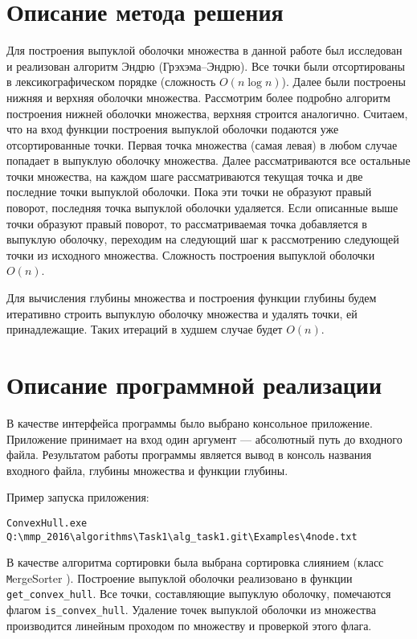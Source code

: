 \documentclass[twoside]{article}
\newcommand{\inlinecode}{\texttt}
\begin{document}
\section{Описание метода решения}
Для построения выпуклой оболочки множества в данной работе был исследован и реализован алгоритм Эндрю (Грэхэма--Эндрю). Все точки были отсортированы в лексикографическом порядке (сложность $O(n \log n)$). Далее были построены нижняя и верхняя оболочки множества. Рассмотрим более подробно алгоритм построения нижней оболочки множества, верхняя строится аналогично. Считаем, что на вход функции построения выпуклой оболочки подаются уже отсортированные точки. Первая точка множества (самая левая) в любом случае попадает в выпуклую оболочку множества. Далее рассматриваются все остальные точки множества, на каждом шаге рассматриваются текущая точка и две последние точки выпуклой оболочки. Пока эти точки не образуют правый поворот, последняя точка выпуклой оболочки удаляется. Если описанные выше точки образуют правый поворот, то рассматриваемая точка добавляется в выпуклую оболочку, переходим на следующий шаг к рассмотрению следующей точки из исходного множества. Сложность построения выпуклой оболочки $O(n)$.

Для вычисления глубины множества и построения функции глубины будем итеративно строить выпуклую оболочку множества и удалять точки, ей принадлежащие. Таких итераций в худшем случае будет $O(n)$. 
\section{Описание программной реализации}
В качестве интерфейса программы было выбрано консольное приложение. Приложение принимает на вход один аргумент --- абсолютный путь до входного файла. Результатом работы программы является вывод в консоль названия входного файла, глубины множества и функции глубины. 

Пример запуска приложения:
\begin{lstlisting}
ConvexHull.exe Q:\mmp_2016\algorithms\Task1\alg_task1.git\Examples\4node.txt
\end{lstlisting}

В качестве алгоритма сортировки была выбрана сортировка слиянием (класс 
\inlinecode MergeSorter ). Построение выпуклой оболочки реализовано в функции  \inlinecode{get\_convex\_hull}. Все точки, составляющие выпуклую оболочку, помечаются флагом \inlinecode{is\_convex\_hull}. Удаление точек выпуклой оболочки из множества производится линейным проходом по множеству и проверкой этого флага.
\end{document}
